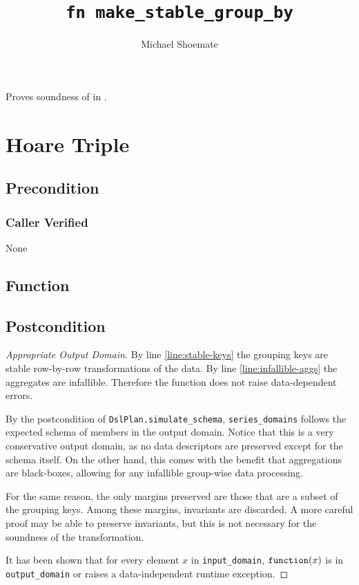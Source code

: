\documentclass{article}
\title{\texttt{fn make\_stable\_group\_by}}
\author{Michael Shoemate}
\begin{document}
\maketitle  


\contrib

Proves soundness of  
in .

\section{Hoare Triple}
\subsection*{Precondition}
\subsubsection*{Caller Verified}
None

\subsection*{Function}
\label{sec:python-pseudocode}


\subsection*{Postcondition}

\begin{proof}[Appropriate Output Domain]
    By line \ref{line:stable-keys} the grouping keys are stable row-by-row transformations of the data.
    By line \ref{line:infallible-aggs} the aggregates are infallible.
    Therefore the function does not raise data-dependent errors.

    By the postcondition of \texttt{DslPlan.simulate\_schema},
    \texttt{series\_domains} follows the expected schema of members in the output domain.
    Notice that this is a very conservative output domain, as no data descriptors are preserved except for the schema itself.
    On the other hand, this comes with the benefit that aggregations are black-boxes, allowing for any infallible group-wise data processing.

    For the same reason, the only margins preserved are those that are a subset of the grouping keys.
    Among these margins, invariants are discarded. A more careful proof may be able to preserve invariants,
    but this is not necessary for the soundness of the transformation.

    It has been shown that for every element $x$ in \texttt{input\_domain}, $\texttt{function}(x)$ is in \texttt{output\_domain} or raises a data-independent runtime exception.
\end{proof}
\end{document}
